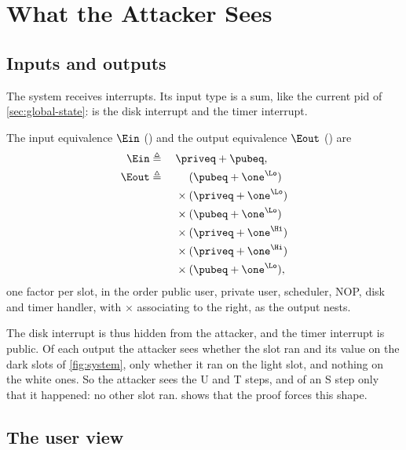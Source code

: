 \section{What the Attacker Sees}\label{sec:attacker}


\subsection{Inputs and outputs}\label{sec:io}

The system receives interrupts. Its input type  is a sum, like the
current pid of \cref{sec:global-state}:  is the disk interrupt and
 the timer interrupt. 

\begin{definition}\label{def:io}
The input equivalence $\Ein$ () and the output equivalence $\Eout$
() are
\begin{alignat*}{2}
\Ein &\triangleq{} && \priveq + \pubeq, \\
\Eout &\triangleq{} && \hphantom{{}\times{}}(\pubeq + \one^\Lo) \\
&&& {}\times (\priveq + \one^\Lo) \\
&&& {}\times (\pubeq + \one^\Lo) \\
&&& {}\times (\priveq + \one^\Hi) \\
&&& {}\times (\priveq + \one^\Hi) \\
&&& {}\times (\pubeq + \one^\Lo),
\end{alignat*}
one factor per slot, in the order public user, private user, scheduler, NOP,
disk and timer handler, with $\times$ associating to the right, as the output
nests.
\end{definition}

The disk interrupt is thus hidden from the attacker, and the timer interrupt is
public. Of each output the attacker sees whether the slot ran and its value on the
dark slots of \cref{fig:system}, only whether it ran on the light slot, and nothing
on the white ones.
So the attacker sees the U and T steps, and of an S step only that it happened: no
other slot ran.  shows that the proof forces this shape.

\subsection{The user view}\label{sec:userview}

